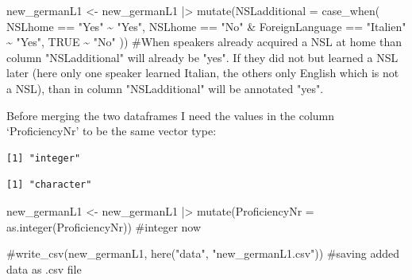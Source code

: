 \documentclass[
  letterpaper,
  DIV=11,
  numbers=noendperiod]{scrartcl}
\newenvironment{Shaded}{\begin{snugshade}}{\end{snugshade}}
\newcommand{\AttributeTok}[1]{\textcolor[rgb]{0.40,0.45,0.13}{#1}}
\newcommand{\CommentTok}[1]{\textcolor[rgb]{0.37,0.37,0.37}{#1}}
\newcommand{\ConstantTok}[1]{\textcolor[rgb]{0.56,0.35,0.01}{#1}}
\newcommand{\FunctionTok}[1]{\textcolor[rgb]{0.28,0.35,0.67}{#1}}
\newcommand{\NormalTok}[1]{\textcolor[rgb]{0.00,0.23,0.31}{#1}}
\newcommand{\OtherTok}[1]{\textcolor[rgb]{0.00,0.23,0.31}{#1}}
\newcommand{\SpecialCharTok}[1]{\textcolor[rgb]{0.37,0.37,0.37}{#1}}
\newcommand{\StringTok}[1]{\textcolor[rgb]{0.13,0.47,0.30}{#1}}
\begin{document}
\begin{Shaded}
\begin{Highlighting}[]
\NormalTok{new\_germanL1 }\OtherTok{\textless{}{-}}\NormalTok{ new\_germanL1 }\SpecialCharTok{|\textgreater{}}
  \FunctionTok{mutate}\NormalTok{(}\AttributeTok{NSLadditional =} \FunctionTok{case\_when}\NormalTok{(}
\NormalTok{    NSLhome }\SpecialCharTok{==} \StringTok{"Yes"} \SpecialCharTok{\textasciitilde{}} \StringTok{"Yes"}\NormalTok{,}
\NormalTok{    NSLhome }\SpecialCharTok{==} \StringTok{"No"} \SpecialCharTok{\&}\NormalTok{ ForeignLanguage }\SpecialCharTok{==} \StringTok{"Italien"} \SpecialCharTok{\textasciitilde{}} \StringTok{"Yes"}\NormalTok{,}
    \ConstantTok{TRUE} \SpecialCharTok{\textasciitilde{}} \StringTok{"No"} 
\NormalTok{  )) }\CommentTok{\#When speakers already acquired a NSL at home than column "NSLadditional" will already be "yes". If they did not but learned a NSL later (here only one speaker learned Italian, the others only English which is not a NSL), than in column "NSLadditional" will be annotated "yes".}
\end{Highlighting}
\end{Shaded}

Before merging the two dataframes I need the values in the column
`ProficiencyNr' to be the same vector type:

\begin{Shaded}
\end{Shaded}

\begin{verbatim}
[1] "integer"
\end{verbatim}

\begin{Shaded}
\end{Shaded}

\begin{verbatim}
[1] "character"
\end{verbatim}

\begin{Shaded}
\begin{Highlighting}[]
\NormalTok{new\_germanL1 }\OtherTok{\textless{}{-}}\NormalTok{ new\_germanL1 }\SpecialCharTok{|\textgreater{}} 
  \FunctionTok{mutate}\NormalTok{(}\AttributeTok{ProficiencyNr =} \FunctionTok{as.integer}\NormalTok{(ProficiencyNr)) }\CommentTok{\#integer now}

\CommentTok{\#write\_csv(new\_germanL1, here("data", "new\_germanL1.csv")) \#saving added data as .csv file}
\end{Highlighting}
\end{Shaded}
\end{document}
